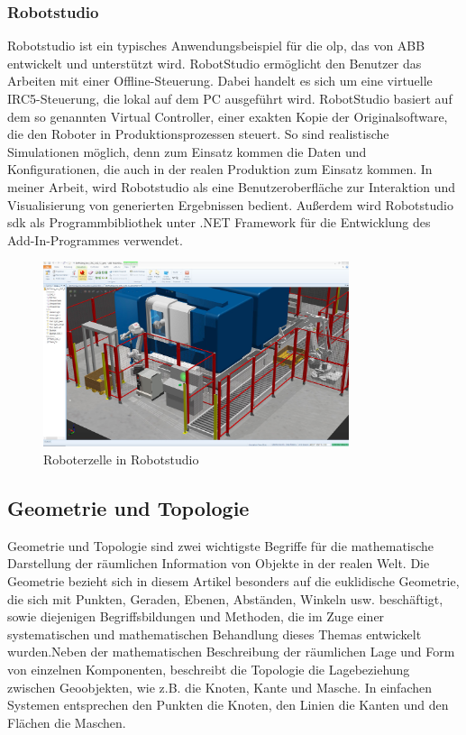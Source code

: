 \documentclass[14pt,a4paper,titlepage]{article}
\begin{document}
	\subsubsection{Robotstudio}
	Robotstudio ist ein typisches Anwendungsbeispiel für die \acf{olp}, das von ABB entwickelt und unterstützt wird. RobotStudio ermöglicht den Benutzer das Arbeiten mit einer Offline-Steuerung. Dabei
	handelt es sich um eine virtuelle IRC5-Steuerung, die lokal auf dem PC ausgeführt
	wird. RobotStudio basiert auf dem so genannten Virtual Controller, einer exakten Kopie der Originalsoftware, die den Roboter in Produktionsprozessen steuert. So sind realistische Simulationen möglich, denn zum Einsatz kommen die Daten und Konfigurationen, die auch in der realen Produktion zum Einsatz kommen.\cite{robotstudio} 
	In meiner Arbeit, wird Robotstudio als eine Benutzeroberfläche zur Interaktion und Visualisierung von generierten Ergebnissen bedient. Außerdem wird Robotstudio \acf{sdk} als Programmbibliothek unter .NET Framework für die Entwicklung des Add-In-Programmes verwendet.
	\begin{figure}[h!]
		\centering
		\includegraphics[width=0.8\textwidth]{robotstudio.jpg}
		\caption{Roboterzelle in Robotstudio}
		\label{fig2}
	\end{figure} 
	\pagebreak 
	\subsection{Geometrie und Topologie}
		Geometrie und Topologie sind zwei wichtigste Begriffe für die mathematische Darstellung der räumlichen Information von Objekte in der realen Welt. Die Geometrie bezieht sich in diesem Artikel besonders auf die euklidische Geometrie, die sich mit Punkten, Geraden, Ebenen, Abständen, Winkeln usw. beschäftigt, sowie diejenigen Begriffsbildungen und Methoden, die im Zuge einer systematischen und mathematischen Behandlung dieses Themas entwickelt wurden.\cite{geometrie}Neben der mathematischen Beschreibung der räumlichen Lage und Form von einzelnen Komponenten, beschreibt die Topologie die Lagebeziehung zwischen Geoobjekten, wie z.B. die Knoten, Kante und Masche. In einfachen Systemen entsprechen den Punkten die Knoten, den Linien die Kanten und den Flächen die Maschen.\cite{topologie}
		
\end{document}
